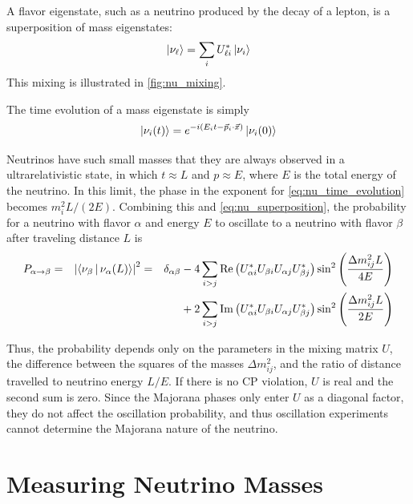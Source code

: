 \documentclass[herrin-thesis.tex]{subfiles}
\begin{document}
 A flavor eigenstate, such as a neutrino produced by the decay of a lepton, is a superposition of mass eigenstates:
 \begin{equation}
 \Ket{\nu_{\ell}} = \sum_{i}U_{\ell i}^{*} \Ket{\nu_i}
 \label{eq:nu_superposition}
 \end{equation}
 This mixing is illustrated in \cref{fig:nu_mixing}.
 
 The time evolution of a mass eigenstate is simply
 \begin{equation}
 \Ket{\nu_{i}(t)} = e^{-i(E_i t - \vec{p}_i\cdot\vec{x})}\Ket{\nu_i(0)}
 \label{eq:nu_time_evolution}
 \end{equation}

Neutrinos have such small masses that they are always observed in a ultrarelativistic state, in which \(t\approx L\) and \(p\approx E\), where \(E\) is the total energy of the neutrino. In this limit, the phase in the exponent for \cref{eq:nu_time_evolution} becomes \(m_i^2 L/(2E)\). Combining this and \cref{eq:nu_superposition}, the probability for a neutrino with flavor \(\alpha\) and energy \(E\) to oscillate to a neutrino with flavor \(\beta\) after traveling distance \(L\) is
\begin{align}
P_{\alpha\rightarrow\beta}	&=& \left | \Braket{\nu_\beta | \nu_\alpha(L)} \right |^2	& =& \delta_{\alpha\beta}	& - 4\sum_{i>j}\text{Re}\left(U_{\alpha i}^{*}U_{\beta i}U_{\alpha j}U_{\beta j}^{*}\right)\sin^2\left(\frac{\Delta m_{ij}^2 L}{4 E}\right)\nonumber\\
						&  &											&   &					& +2\sum_{i>j}\text{Im}\left(U_{\alpha i}^{*}U_{\beta i}U_{\alpha j}U_{\beta j}^{*}\right)\sin^2\left(\frac{\Delta m_{ij}^2 L}{2 E}\right)
\label{eq:nu_oscillation_prob}
\end{align}

Thus, the probability depends only on the parameters in the mixing matrix \(U\), the difference between the squares of the masses \(\Delta m_{ij}^2\), and the ratio of distance travelled to neutrino energy \(L/E\). If there is no CP violation, \(U\) is real and the second sum is zero. Since the Majorana phases only enter \(U\) as a diagonal factor, they do not affect the oscillation probability, and thus oscillation experiments cannot determine the Majorana nature of the neutrino.

\section{Measuring Neutrino Masses}
\end{document}
